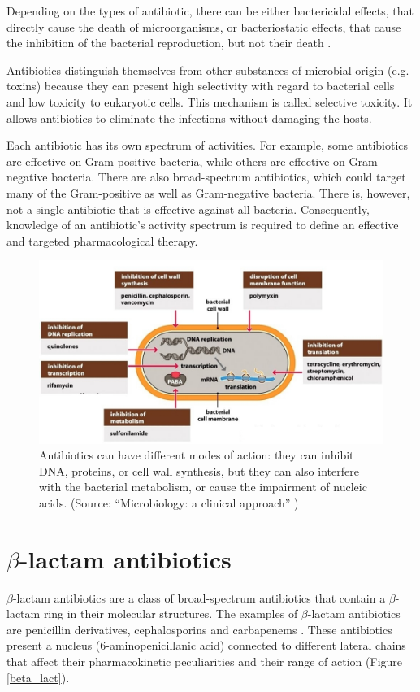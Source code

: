 \documentclass[11pt]{report}
\begin{document}
Depending on the types of antibiotic, there can be either bactericidal effects, that directly cause the death of microorganisms, or bacteriostatic effects, that cause the inhibition of the bacterial reproduction, but not their death \cite{Leekha2011}.

Antibiotics distinguish themselves from other substances of microbial origin (e.g. toxins) because they can present high selectivity with regard to bacterial cells and low toxicity to eukaryotic cells.
This mechanism is called selective toxicity.
It allows antibiotics to eliminate the infections without damaging the hosts.

Each antibiotic has its own spectrum of activities.
For example, some antibiotics are effective on Gram-positive bacteria, while others are effective on Gram-negative bacteria.
There are also broad-spectrum antibiotics, which could target many of the Gram-positive as well as Gram-negative bacteria.
There is, however, not a single antibiotic that is effective against all bacteria.
Consequently, knowledge of an antibiotic’s activity spectrum is required to define an effective and targeted pharmacological therapy.

\clearpage
\begin{figure}[htp]
\centering
\includegraphics[scale=0.4500]{img/ant_targ.png}
\caption{Antibiotics can have different modes of action: they can inhibit DNA, proteins, or cell wall synthesis, but they can also interfere with the bacterial metabolism, or cause the impairment of nucleic acids.
(Source: ``Microbiology: a clinical approach'' \cite{microbiology})}
\label{ant_targ}
\end{figure}

\section{$\beta$-lactam antibiotics}
$\beta$-lactam antibiotics are a class of broad-spectrum antibiotics that contain a $\beta$-lactam ring in their molecular structures.
The examples of $\beta$-lactam antibiotics are penicillin derivatives, cephalosporins and carbapenems \cite{Pitout2005}.
These antibiotics present a nucleus (6-aminopenicillanic acid) connected to different lateral chains that affect their pharmacokinetic peculiarities and their range of action (Figure \ref{beta_lact}).
\end{document}
